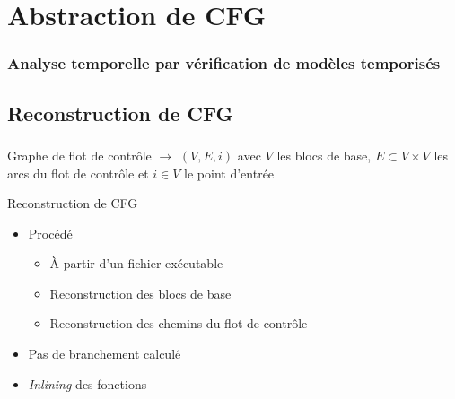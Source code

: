 \documentclass{beamer}
\begin{document}
  \section{Abstraction de CFG}
  \begin{frame}
    \frametitle{Analyse temporelle par vérification de modèles temporisés}
    \tableofcontents[currentsection]
  \end{frame}
  
  \subsection{Reconstruction de CFG}
  \begin{frame}
    \frametitle{\secname}
    \framesubtitle{\subsecname}

    \begin{block}{Graphe de flot de contrôle}
      $\rightarrow$ $(V,E,i)$ avec $V$ les blocs de base, $E \subset V \times V$
      les arcs du flot de contrôle et $i \in V$ le point d'entrée
    \end{block}

    \vfill
    \begin{block}{Reconstruction de CFG}
      \begin{itemize}
        \item Procédé
          \begin{itemize}
            \item À partir d'un fichier exécutable
            \item Reconstruction des blocs de base
            \item Reconstruction des chemins du flot de contrôle
          \end{itemize}
        \item \alert{Pas de branchement calculé}
        \item \alert{\emph{Inlining} des fonctions}
      \end{itemize}
    \end{block}
  \end{frame}
\end{document}
